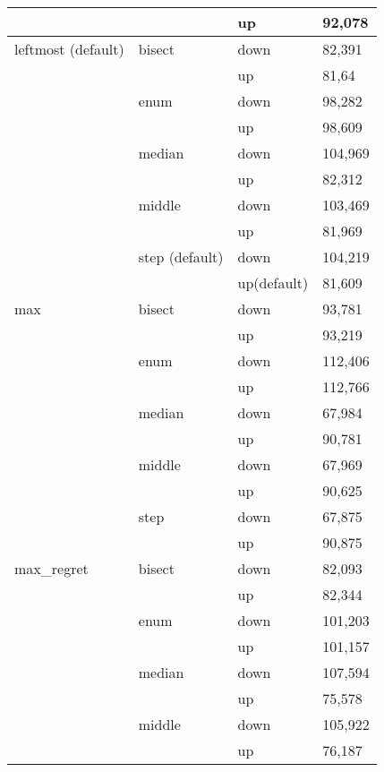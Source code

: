 \begin{longtable}{llll}
          &       & up    & 92,078 \\ \hline
    \multicolumn{1}{l}{leftmost (default)} & \multicolumn{1}{l}{bisect} & down  & 82,391 \\
          &       & up    & 81,64 \\
          & \multicolumn{1}{l}{enum} & down  & 98,282 \\
          &       & up    & 98,609 \\
          & \multicolumn{1}{l}{median} & down  & 104,969 \\
          &       & up    & 82,312 \\
          & \multicolumn{1}{l}{middle} & down  & 103,469 \\
          &       & up    & 81,969 \\
          & \multicolumn{1}{l}{step (default)} & down  & 104,219 \\
          &       & up(default) & 81,609 \\ \hline
    \multicolumn{1}{l}{max} & \multicolumn{1}{l}{bisect} & down  & 93,781 \\
          &       & up    & 93,219 \\
          & \multicolumn{1}{l}{enum} & down  & 112,406 \\
          &       & up    & 112,766 \\
          & \multicolumn{1}{l}{median} & down  & 67,984 \\
          &       & up    & 90,781 \\
          & \multicolumn{1}{l}{middle} & down  & 67,969 \\
          &       & up    & 90,625 \\
          & \multicolumn{1}{l}{step} & down  & 67,875 \\
          &       & up    & 90,875 \\ \hline
    \multicolumn{1}{l}{max\_regret} & \multicolumn{1}{l}{bisect} & down  & 82,093 \\
          &       & up    & 82,344 \\
          & \multicolumn{1}{l}{enum} & down  & 101,203 \\
          &       & up    & 101,157 \\
          & \multicolumn{1}{l}{median} & down  & 107,594 \\
          &       & up    & 75,578 \\
          & \multicolumn{1}{l}{middle} & down  & 105,922 \\
          &       & up    & 76,187 \\

\end{longtable}
